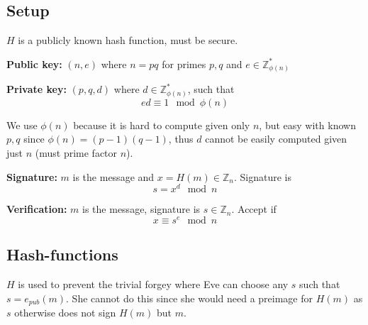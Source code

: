
\subsection{Setup}
$H$ is a publicly known hash function, must be secure.

\textbf{Public key:} $(n, e)$ where $n = pq$ for primes $p, q$ and $e \in \mathbb{Z}_{\phi(n)}^*$

\textbf{Private key:} $(p, q, d)$ where $d \in \mathbb{Z}_{\phi(n)}^*$, such that
\[ ed \equiv 1 \mod \phi(n) \]

We use $\phi(n)$ because it is hard to compute given only $n$, but
easy with known $p, q$ since $\phi(n) = (p-1)(q-1)$, thus $d$ cannot
be easily computed given just $n$ (must prime factor $n$).

\textbf{Signature:} $m$ is the message and $x = H(m) \in \mathbb{Z}_n$. Signature is
\[ s = x^d \mod n \]

\textbf{Verification:} $m$ is the message, signature is $s \in \mathbb{Z}_n$. Accept if
\[ x \equiv s^e \mod n \]

\subsection{Hash-functions}
$H$ is used to prevent the trivial forgey where Eve can choose any $s$
such that $s = e_{pub}(m)$. She cannot do this since she would need a
preimage for $H(m)$ as $s$ otherwise does not sign $H(m)$ but $m$.
